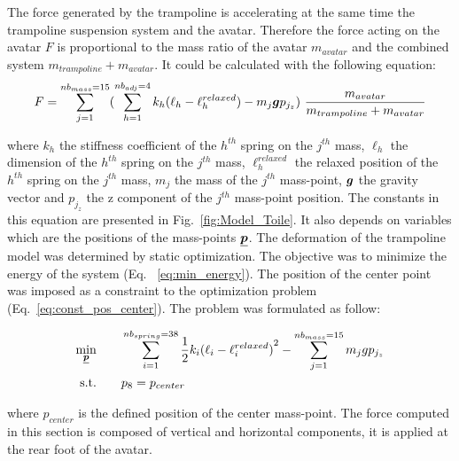 The force generated by the trampoline is accelerating at the same time the trampoline suspension system and the avatar.
Therefore the force acting on the avatar $F$ is proportional to the mass ratio of the avatar $m_{avatar}$ and the combined system $m_{trampoline} + m_{avatar}$.
It could be calculated with the following equation:
\[
F = \sum_{j=1}^{nb_{mass}=15} ( \sum_{h=1}^{nb_{adj}=4} k_h {(\ell_h - {\ell}^{relaxed}_h)} - m_j \bm{g}p_{j_z}) ~ \frac{m_{avatar}}{m_{trampoline} + m_{avatar} }  \label{eq:Force_trampo}
\]

\noindent where ${k_h}$ the stiffness coefficient of the $h^{th}$ spring on the $j^{th}$ mass, $\ell_h$ the dimension of the $h^{th}$ spring on the $j^{th}$ mass, ${\ell}^{relaxed}_h$ the relaxed position of the $h^{th}$ spring on the $j^{th}$ mass, $m_j$ the mass of the $j^{th}$ mass-point,  $\bm{g}$ the gravity vector and $p_{j_z}$ the z component of the $j^{th}$ mass-point position.
The constants in this equation are presented in Fig.~\ref{fig:Model_Toile}.
It also depends on variables which are the positions of the mass-points $\underline{\bm{p}}$.
The deformation of the trampoline model was determined by static optimization.
The objective was to minimize the energy of the system (Eq. ~\ref{eq:min_energy}).
The position of the center point was imposed as a constraint to the optimization problem (Eq.~\ref{eq:const_pos_center}).
The problem was formulated as follow:  

\begin{subequations}
\begin{align}
 \underset{\substack{\underline{\bm{p}}}}{\min} \hspace{2em} & \sum_{i=1}^{nb_{spring}=38} \dfrac{1}{2} k_i {(\ell_i - {\ell}^{relaxed}_i)}^{2} - \sum_{j=1}^{nb_{mass}=15} m_j g p_{j_z} \label{eq:min_energy} \\ 
   \text{s.t.}  \hspace{2em}  & p_{8} = p_{center} \label{eq:const_pos_center}
\end{align}
\end{subequations}

\noindent where $p_{center}$ is the defined position of the center mass-point.
The force computed in this section is composed of vertical and horizontal components, it is applied at the rear foot of the avatar.



